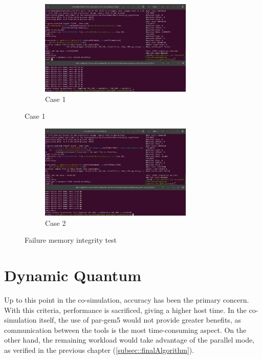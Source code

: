 \begin{figure}[!b]

	\centering
	\begin{subfigure}{\textwidth}
		\centering
		\includegraphics[width=0.8\textwidth]{Images/Failure_MemoryIntegrity1.png}
		\caption{Case 1}
	\end{subfigure}
\end{figure}
\begin{figure}[ht] \ContinuedFloat
	\begin{subfigure}{\textwidth}
		\centering
		\includegraphics[width=0.8\textwidth]{Images/Failure_MemoryIntegrity2.png}
		\caption{Case 2}
	\end{subfigure}

	\caption{Failure memory integrity test}
	\label{fig_Failure_MemoryIntegrity}
\end{figure}


\section{Dynamic Quantum}

Up to this point in the co-simulation, accuracy has been the primary concern. With this criteria, performance is sacrificed, giving a higher
host time. In the co-simulation itself, the use of par-gem5 would not provide greater benefits, as communication between the tools 
is the most time-consuming aspect. On the other hand, the remaining workload would take advantage of the parallel mode, as verified in the 
previous chapter (\ref{subsec::finalAlgorithm}). 

